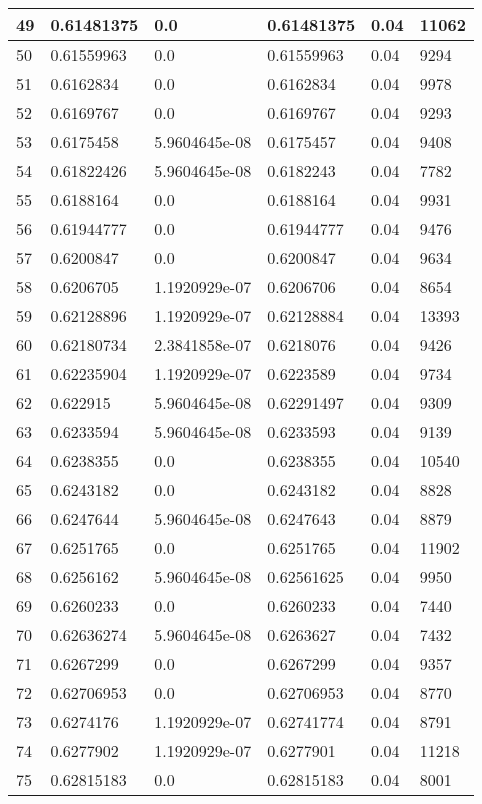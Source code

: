 \begin{longtable}{|l|l|l|l|l|l|}
49 & 0.61481375 & 0.0 & 0.61481375 & 0.04 & 11062 \\ \hline 
50 & 0.61559963 & 0.0 & 0.61559963 & 0.04 & 9294 \\ \hline 
51 & 0.6162834 & 0.0 & 0.6162834 & 0.04 & 9978 \\ \hline 
52 & 0.6169767 & 0.0 & 0.6169767 & 0.04 & 9293 \\ \hline 
53 & 0.6175458 & 5.9604645e-08 & 0.6175457 & 0.04 & 9408 \\ \hline 
54 & 0.61822426 & 5.9604645e-08 & 0.6182243 & 0.04 & 7782 \\ \hline 
55 & 0.6188164 & 0.0 & 0.6188164 & 0.04 & 9931 \\ \hline 
56 & 0.61944777 & 0.0 & 0.61944777 & 0.04 & 9476 \\ \hline 
57 & 0.6200847 & 0.0 & 0.6200847 & 0.04 & 9634 \\ \hline 
58 & 0.6206705 & 1.1920929e-07 & 0.6206706 & 0.04 & 8654 \\ \hline 
59 & 0.62128896 & 1.1920929e-07 & 0.62128884 & 0.04 & 13393 \\ \hline 
60 & 0.62180734 & 2.3841858e-07 & 0.6218076 & 0.04 & 9426 \\ \hline 
61 & 0.62235904 & 1.1920929e-07 & 0.6223589 & 0.04 & 9734 \\ \hline 
62 & 0.622915 & 5.9604645e-08 & 0.62291497 & 0.04 & 9309 \\ \hline 
63 & 0.6233594 & 5.9604645e-08 & 0.6233593 & 0.04 & 9139 \\ \hline 
64 & 0.6238355 & 0.0 & 0.6238355 & 0.04 & 10540 \\ \hline 
65 & 0.6243182 & 0.0 & 0.6243182 & 0.04 & 8828 \\ \hline 
66 & 0.6247644 & 5.9604645e-08 & 0.6247643 & 0.04 & 8879 \\ \hline 
67 & 0.6251765 & 0.0 & 0.6251765 & 0.04 & 11902 \\ \hline 
68 & 0.6256162 & 5.9604645e-08 & 0.62561625 & 0.04 & 9950 \\ \hline 
69 & 0.6260233 & 0.0 & 0.6260233 & 0.04 & 7440 \\ \hline 
70 & 0.62636274 & 5.9604645e-08 & 0.6263627 & 0.04 & 7432 \\ \hline 
71 & 0.6267299 & 0.0 & 0.6267299 & 0.04 & 9357 \\ \hline 
72 & 0.62706953 & 0.0 & 0.62706953 & 0.04 & 8770 \\ \hline 
73 & 0.6274176 & 1.1920929e-07 & 0.62741774 & 0.04 & 8791 \\ \hline 
74 & 0.6277902 & 1.1920929e-07 & 0.6277901 & 0.04 & 11218 \\ \hline 
75 & 0.62815183 & 0.0 & 0.62815183 & 0.04 & 8001 \\ \hline 
\end{longtable}